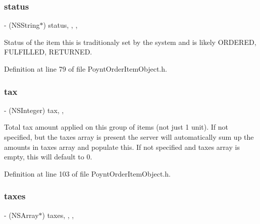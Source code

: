 \subsubsection{\texorpdfstring{status}{status}}
{\footnotesize\ttfamily -\/ (N\+S\+String$\ast$) status\hspace{0.3cm}{\ttfamily [read]}, {\ttfamily [write]}, {\ttfamily [nonatomic]}, {\ttfamily [copy]}}



Status of the item  this is traditionaly set by the system and is likely \textquotesingle{}O\+R\+D\+E\+R\+ED\textquotesingle{}, \textquotesingle{}F\+U\+L\+F\+I\+L\+L\+ED\textquotesingle{}, \textquotesingle{}R\+E\+T\+U\+R\+N\+ED\textquotesingle{}. 



Definition at line 79 of file Poynt\+Order\+Item\+Object.\+h.

\hypertarget{interface_poynt_order_item_object_a23a4b2c80d04d250fb56741b46a2cb0d}{}\label{interface_poynt_order_item_object_a23a4b2c80d04d250fb56741b46a2cb0d} 
\subsubsection{\texorpdfstring{tax}{tax}}
{\footnotesize\ttfamily -\/ (N\+S\+Integer) tax\hspace{0.3cm}{\ttfamily [read]}, {\ttfamily [nonatomic]}, {\ttfamily [assign]}}



Total tax amount applied on this group of items (not just 1 unit).  If not specified, but the taxes array is present the server will automatically sum up the amounts in taxes array and populate this. If not specified and taxes array is empty, this will default to 0. 



Definition at line 103 of file Poynt\+Order\+Item\+Object.\+h.

\hypertarget{interface_poynt_order_item_object_a24101b932074a386b535ab58e819bf71}{}\label{interface_poynt_order_item_object_a24101b932074a386b535ab58e819bf71} 
\subsubsection{\texorpdfstring{taxes}{taxes}}
{\footnotesize\ttfamily -\/ (N\+S\+Array$\ast$) taxes\hspace{0.3cm}{\ttfamily [read]}, {\ttfamily [write]}, {\ttfamily [nonatomic]}, {\ttfamily [strong]}}



